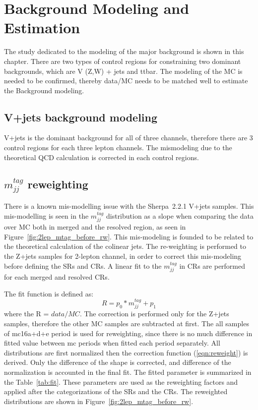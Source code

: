 \chapter{Background Modeling and Estimation}
\label{chap:modeling}
The study dedicated to the modeling of the major background is shown in this chapter. There are two types of control regions for constraining two dominant backgrounds, which are V (Z,W) + jets and ttbar. The modeling of the MC is needed to be confirmed, thereby data/MC needs to be matched well to estimate the Background modeling.

\section{V+jets background modeling}
V+jets is the dominant background for all of three channels, therefore there are 3 control regions for each three lepton channels. The mismodeling due to the theoretical QCD calculation is corrected in each control regions. 

\section{$m_{jj}^{tag}$ reweighting}
There is a known mis-modelling issue with the Sherpa~2.2.1 V+jets samples. This mis-modelling is seen in the $m^{tag}_{jj}$ distribution as a slope when comparing the data over MC both in merged and the resolved region, as seen in Figure~\ref{fig:2lep_mtag_before_rw}. 
This mis-modeling is founded to be related to the theoretical calculation of the colinear jets. 
The re-weighting is performed to the Z+jets samples for 2-lepton channel, in order to correct this mis-modeling before defining the SRs and CRs. A linear fit to the $m^{tag}_{jj}$ in CRs are performed for each merged and resolved CRs. 

The fit function is defined as:
\begin{equation}
\label{eqn:reweight}
R=p_{0} * m_{jj}^{tag}+p_{1}
\end{equation}
where the R = $data/MC$. The correction is performed only for the Z+jets samples, therefore the other MC samples are subtracted at first. The all samples of mc16a+d+e period is used for reweighting, since there is no much difference in fitted value between mc periods when fitted each period separately. All distributions are first normalized then the correction function (\ref{eqn:reweight}) is derived. Only the difference of the shape is corrected, and difference of the normalization is accounted in the final fit.
The fitted parameter is summarized in the Table~\ref{tab:fit}. These parameters are used as the reweighting factors and applied after the categorizations of the SRs and the CRs. The reweighted distributions are shown in Figure~\ref{fig:2lep_mtag_before_rw}.

